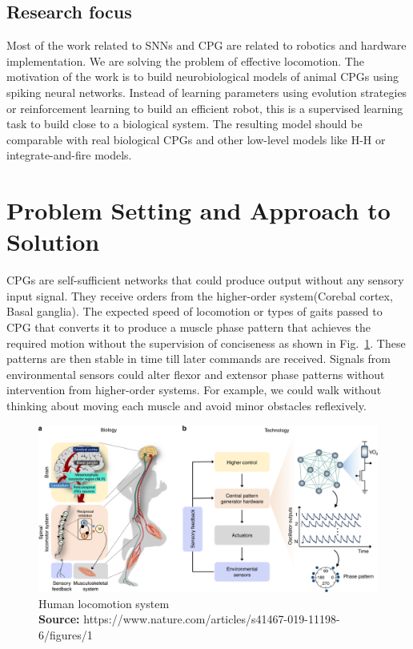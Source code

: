 \documentclass[runningheads]{llncs}
\newcommand*{\captionsource}[2]{%
  \caption[{#1}]{%
    #1%
    \\\hspace{\linewidth}%
    \textbf{Source:} #2%
  }%
}
\begin{document}
\subsection{Research focus}
Most of the work related to SNNs and CPG are related to robotics and hardware implementation. We are solving the problem of effective locomotion. The motivation of the work is to build neurobiological models of animal CPGs using spiking neural networks. Instead of learning parameters using evolution strategies or reinforcement learning to build an efficient robot, this is a supervised learning task to build close to a biological system. The resulting model should be comparable with real biological CPGs and other low-level models like H-H or integrate-and-fire models. 

\section{Problem Setting and Approach to Solution}
CPGs are self-sufficient networks that could produce output without any sensory input signal. They receive orders from the higher-order system(Corebal cortex, Basal ganglia). The expected speed of locomotion or types of gaits passed to CPG that converts it to produce a muscle phase pattern that achieves the required motion without the supervision of conciseness as shown in Fig.~\ref{fig2}. These patterns are then stable in time till later commands are received. Signals from environmental sensors could alter flexor and extensor phase patterns without intervention from higher-order systems. For example, we could walk without thinking about moving each muscle and avoid minor obstacles reflexively.

\begin{figure}
\includegraphics[width=\textwidth]{images/cpg_img.png}

\captionsource{Human locomotion system}{ https://www.nature.com/articles/s41467-019-11198-6/figures/1} \label{fig2}

\end{figure}
\end{document}
